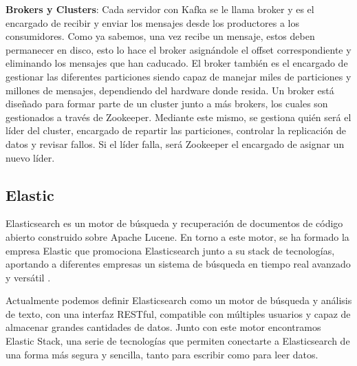 \textbf{Brokers y Clusters}: Cada servidor con Kafka se le llama broker y es el encargado de recibir y enviar los mensajes desde los productores a los consumidores. Como ya sabemos, una vez recibe un mensaje, estos deben permanecer en disco, esto lo hace el broker asignándole el offset correspondiente y eliminando los mensajes que han caducado. El broker también es el encargado de gestionar las diferentes particiones siendo capaz de manejar miles de particiones y millones de mensajes, dependiendo del hardware donde resida. Un broker está diseñado para formar parte de un cluster junto a más brokers, los cuales son gestionados a través de Zookeeper. Mediante este mismo, se gestiona quién será el líder del cluster, encargado de repartir las particiones, controlar la replicación de datos y revisar fallos. Si el líder falla, será Zookeeper el encargado de asignar un nuevo líder.


\subsection{Elastic\label{Elastic}}

Elasticsearch es un motor de búsqueda y recuperación de documentos de código abierto construido sobre Apache Lucene. En torno a este motor, se ha formado la empresa Elastic que promociona Elasticsearch junto a su stack de tecnologías, aportando a diferentes empresas un sistema de búsqueda en tiempo real avanzado y versátil \cite{Elk-1}.\par

Actualmente podemos definir Elasticsearch como un motor de búsqueda y análisis de texto, con una interfaz RESTful, compatible con múltiples usuarios y capaz de almacenar grandes cantidades de datos. Junto con este motor encontramos Elastic Stack, una serie de tecnologías que permiten conectarte a Elasticsearch de una forma más segura y sencilla, tanto para escribir como para leer datos.\par

